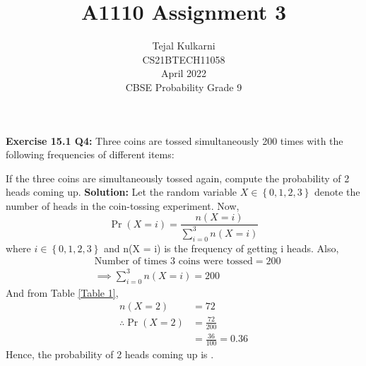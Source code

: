 \documentclass[journal,12pt,two column]{IEEEtran}
\title{A1110 Assignment 3 }
\author{Tejal Kulkarni \\ CS21BTECH11058 \\\vspace*{20pt} April 2022 \\ CBSE Probability Grade 9 }
\begin{document}
\newcommand{\solution}{\noindent \textbf{Solution: }}
\providecommand{\pr}[1]{\ensuremath{\Pr\left(#1\right)}}
\providecommand{\qfunc}[1]{\ensuremath{Q\left(#1\right)}}
\providecommand{\sbrak}[1]{\ensuremath{{}\left[#1\right]}}
\providecommand{\lsbrak}[1]{\ensuremath{{}\left[#1\right.}}
\providecommand{\rsbrak}[1]{\ensuremath{{}\left.#1\right]}}
\providecommand{\brak}[1]{\ensuremath{\left(#1\right)}}
\providecommand{\lbrak}[1]{\ensuremath{\left(#1\right.}}
\providecommand{\rbrak}[1]{\ensuremath{\left.#1\right)}}
\providecommand{\cbrak}[1]{\ensuremath{\left\{#1\right\}}}
\providecommand{\lcbrak}[1]{\ensuremath{\left\{#1\right.}}
\providecommand{\rcbrak}[1]{\ensuremath{\left.#1\right\}}}
\renewcommand{\thetable}{\arabic{table}} 

\maketitle

\textbf{Exercise 15.1 Q4:} Three coins are tossed simultaneously 200 times with the following frequencies of different items:
\begin{table}[ht!]
    \centering
    
    \caption{}
    \label{Table 1}
\end{table}

If the three coins are simultaneously tossed again, compute the probability of 2 heads coming up.
\solution
Let the random variable $X \in \cbrak{0,1,2,3}$ denote the number of heads in the coin-tossing experiment. Now, 
\begin{equation}
   \pr{X = i} = \dfrac{n(X = i)}{\sum_{i=0}^{3} n(X = i) }
\end{equation}
where $i \in \cbrak{0,1,2,3}$ and n(X = i) is the frequency of getting i heads. Also,
\begin{align}
&\text{Number of times 3 coins were tossed} = 200\\ 
&\implies  \sum_{i=0}^{3} n(X = i) = 200
\end{align}
And from Table \ref{Table 1}, 
\begin{align}
                n(X = 2) &= 72 \\
\therefore    \pr{X = 2} &= \frac{72}{200} \\
                         &= \frac{36}{100} = 0.36 
\end{align}
Hence, the probability of 2 heads coming up is .
\end{document}
